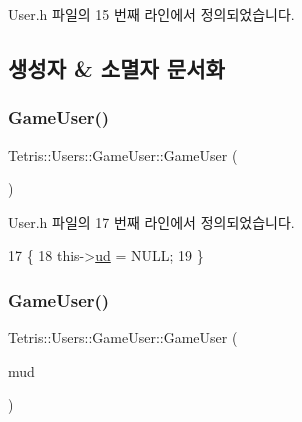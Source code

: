 User.\+h 파일의 15 번째 라인에서 정의되었습니다.



\subsection{생성자 \& 소멸자 문서화}
\mbox{\label{class_tetris_1_1_users_1_1_game_user_af9d7bed8e019ca4348995337ea7339b7}} 
\subsubsection{\texorpdfstring{Game\+User()}{GameUser()}\hspace{0.1cm}{\footnotesize\ttfamily [1/4]}}
{\footnotesize\ttfamily Tetris\+::\+Users\+::\+Game\+User\+::\+Game\+User (\begin{DoxyParamCaption}{ }\end{DoxyParamCaption})\hspace{0.3cm}{\ttfamily [inline]}}



User.\+h 파일의 17 번째 라인에서 정의되었습니다.


\begin{DoxyCode}
17                           \{
18                     this->\hyperlink{class_tetris_1_1_users_1_1_game_user_ac1f44d636258caa01f3041408d235289}{ud} = NULL;
19                 \}
\end{DoxyCode}
\mbox{\label{class_tetris_1_1_users_1_1_game_user_a61819671f799d3d6cb2d89e99ffd1714}} 
\subsubsection{\texorpdfstring{Game\+User()}{GameUser()}\hspace{0.1cm}{\footnotesize\ttfamily [2/4]}}
{\footnotesize\ttfamily Tetris\+::\+Users\+::\+Game\+User\+::\+Game\+User (\begin{DoxyParamCaption}\item[{\hyperlink{class_tetris_1_1_users_1_1_user_data}{User\+Data} $\ast$}]{mud }\end{DoxyParamCaption})\hspace{0.3cm}{\ttfamily [inline]}}



